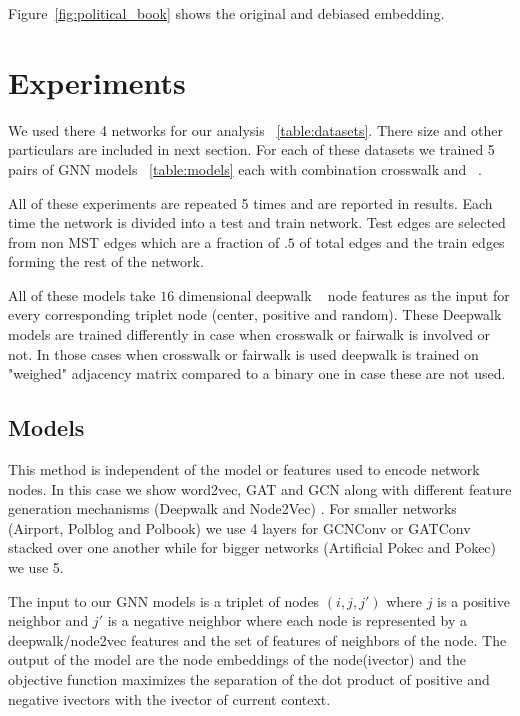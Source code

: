 \documentclass[sigconf,authordraft]{acmart}
\begin{document}

Figure~\ref{fig:political_book} shows the original and debiased embedding. 

\section{Experiments}
We used there 4 networks for our analysis ~\ref{table:datasets}. There size and other particulars are included in next section. For each of these datasets we trained 5 pairs of GNN models ~\ref{table:models} each with combination crosswalk and ~.

All of these experiments are repeated 5 times and are reported in results. Each time the network is divided into a test and train network. Test edges are selected from non MST edges which are a fraction of $.5$ of total edges and the train edges forming the rest of the network.

All of these models take $16$ dimensional deepwalk ~\cite{perozziDeepWalkOnlineLearning2014} node features as the input for every corresponding triplet node (center, positive and random). These Deepwalk models are trained differently in case when crosswalk or fairwalk is involved or not. In those cases when crosswalk or fairwalk is used deepwalk is trained on "weighed" adjacency matrix compared to a binary one in case these are not used.

\subsection{Models}


This method is independent of the model or features used to encode network nodes. In this case we show word2vec, GAT and GCN along with different feature generation mechanisms (Deepwalk and Node2Vec) . For smaller networks (Airport, Polblog and Polbook) we use 4 layers for GCNConv or GATConv stacked over one another while for bigger networks (Artificial Pokec and Pokec) we use 5.

The input to our GNN models is a triplet of nodes $(i,j,j')$ where $j$ is a positive neighbor and $j'$ is a negative neighbor where each node is represented by a deepwalk/node2vec features and the set of features of neighbors of the node. The output of the model are the node embeddings of the node(ivector) and the objective function maximizes the separation of the dot product of positive and negative ivectors with the ivector of current context.
\end{document}
